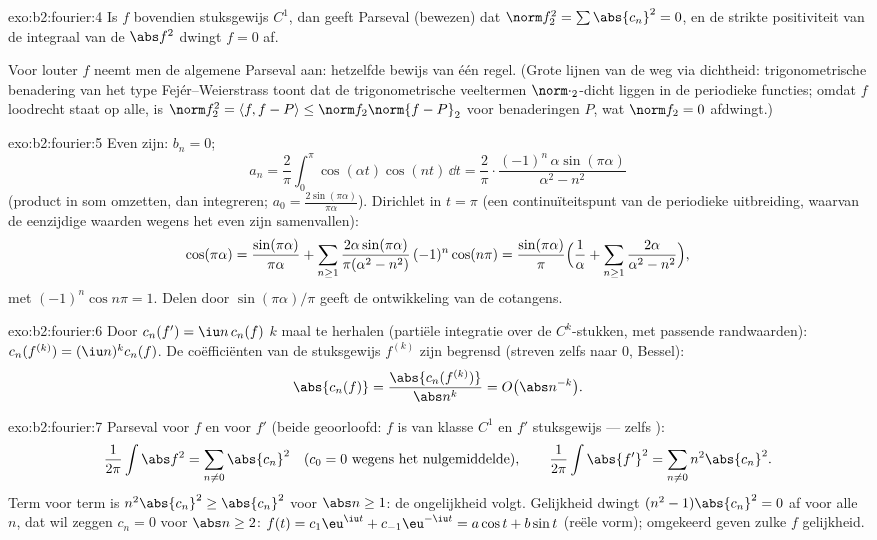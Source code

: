 \begin{solution}{exo:b2:fourier:4}
Is $f$ bovendien stuksgewijs $C^1$, dan geeft Parseval (bewezen)
dat $\norm f_2^2 = \sum\abs{c_n}^2 = 0$, en de strikte
positiviteit van de integraal van de  $\abs f^2$ dwingt $f
= 0$ af.

Voor louter  $f$ neemt men de algemene Parseval aan:
hetzelfde bewijs van één regel. (Grote lijnen van de weg via
dichtheid: trigonometrische benadering van het type
Fejér--Weierstrass toont dat de trigonometrische veeltermen
$\norm\cdot_2$-dicht liggen in de  periodieke functies;
omdat $f$ loodrecht staat op alle, is $\norm f_2^2 = \langle f, f -
P\rangle \leq \norm f_2\norm{f - P}_2$ voor benaderingen $P$, wat
$\norm f_2 = 0$ afdwingt.)
\end{solution}

\begin{solution}{exo:b2:fourier:5}
Even zijn: $b_n = 0$;
\[
a_n = \frac{2}{\pi}\int_0^\pi \cos(\alpha t)\cos(nt)\,\dd t
= \frac{2}{\pi}\cdot
\frac{(-1)^n\,\alpha\sin(\pi\alpha)}{\alpha^2 - n^2}
\]
(product in som omzetten, dan integreren; $a_0 =
\frac{2\sin(\pi\alpha)}{\pi\alpha}$). Dirichlet in $t = \pi$ (een
continuïteitspunt van de periodieke uitbreiding, waarvan de
eenzijdige waarden wegens het even zijn samenvallen):
\[
\cos(\pi\alpha)
= \frac{\sin(\pi\alpha)}{\pi\alpha}
+ \sum_{n\geq1} \frac{2\alpha\sin(\pi\alpha)}{\pi(\alpha^2 -
n^2)}\,(-1)^n\cos(n\pi)
= \frac{\sin(\pi\alpha)}{\pi}\Bigl(\frac{1}{\alpha} +
\sum_{n\geq1}\frac{2\alpha}{\alpha^2 - n^2}\Bigr),
\]
met $(-1)^n\cos n\pi = 1$. Delen door $\sin(\pi\alpha)/\pi$ geeft
de ontwikkeling van de cotangens.
\end{solution}

\begin{solution}{exo:b2:fourier:6}
Door $c_n(f') = \iu n\,c_n(f)$ $k$ maal te herhalen (partiële
integratie over de $C^{k}$-stukken, met passende randwaarden):
$c_n(f^{(k)}) = (\iu n)^k c_n(f)$. De coëfficiënten van de
stuksgewijs  $f^{(k)}$ zijn begrensd (streven zelfs naar
$0$, Bessel):
\[
\abs{c_n(f)} = \frac{\abs{c_n(f^{(k)})}}{\abs n^k}
= O\bigl(\abs n^{-k}\bigr) .
\]
\end{solution}

\begin{solution}{exo:b2:fourier:7}
Parseval voor $f$ en voor $f'$ (beide geoorloofd: $f$ is van klasse
$C^1$ en $f'$ stuksgewijs  --- zelfs ):
\[
\frac{1}{2\pi}\int \abs f^2 = \sum_{n\neq0} \abs{c_n}^2
\quad (c_0 = 0 \text{ wegens het nulgemiddelde}),
\qquad
\frac{1}{2\pi}\int \abs{f'}^2 = \sum_{n\neq0} n^2\abs{c_n}^2 .
\]
Term voor term is $n^2\abs{c_n}^2 \geq \abs{c_n}^2$ voor $\abs n
\geq 1$: de ongelijkheid volgt. Gelijkheid dwingt $(n^2 -
1)\abs{c_n}^2 = 0$ af voor alle $n$, dat wil zeggen $c_n = 0$ voor
$\abs n \geq 2$: $f(t) = c_1\eu^{\iu t} + c_{-1}\eu^{-\iu t} =
a\cos t + b\sin t$ (reële vorm); omgekeerd geven zulke $f$
gelijkheid.
\end{solution}

